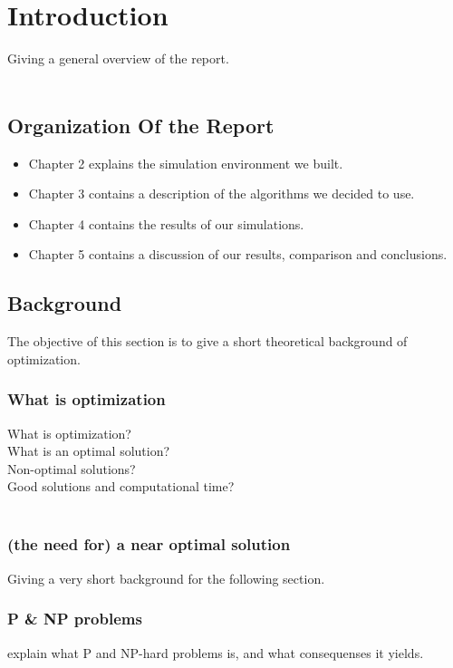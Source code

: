 \chapter{Introduction}
Giving a general overview of the report.\\
\\



\section{Organization Of the Report}

\begin{itemize}
\item Chapter 2 explains the simulation environment we built.
\item Chapter 3 contains a description of the algorithms we decided to use.
\item Chapter 4 contains the results of our simulations.
\item Chapter 5 contains a discussion of our results, comparison and conclusions.
\end{itemize}




\section{Background}
The objective of this section is to give a short theoretical
background of optimization.
\subsection{What is optimization}
What is optimization?\\
What is an optimal solution?\\
Non-optimal solutions?\\
Good solutions and computational time?\\
\\

\subsection{(the need for) a near optimal solution}
Giving a very short background for the following section. 

\subsection{P \& NP problems}
explain what P and NP-hard problems is, and what consequenses it yields. 

